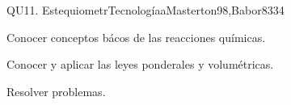 \begin{syllabus}
\begin{unit}{}{QU11. EstequiometrTecnologíaa}{Masterton98,Babor83}{3}{4}
   \begin{learningoutcomes}
      \item Conocer conceptos bácos de las reacciones químicas.
      \item Conocer y aplicar las leyes ponderales y volumétricas.
      \item Resolver problemas.
   \end{learningoutcomes}
\end{unit}



\begin{coursebibliography}
\end{coursebibliography}
\end{syllabus}
